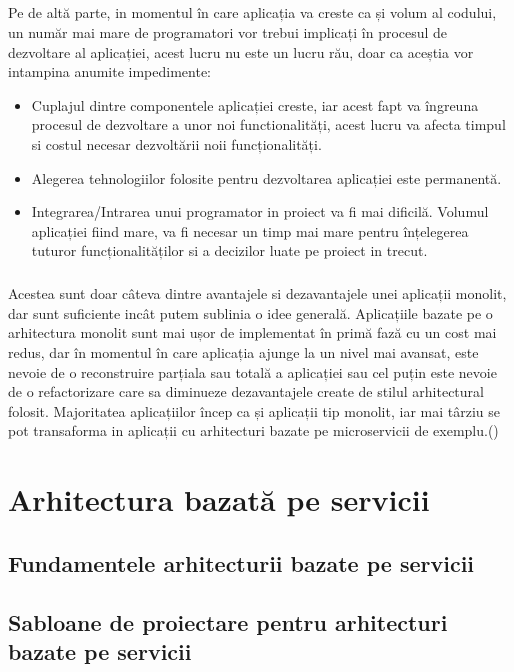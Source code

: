 \documentclass[12pt]{report}
\begin{document}
  	\paragraph{}Pe de altă parte, in momentul în care aplicația va creste ca și volum al codului, un număr mai mare de programatori vor trebui implicați în procesul de dezvoltare al aplicației, acest lucru nu este un lucru rău, doar ca aceștia vor intampina anumite impedimente:
  	\begin{itemize}
  	\item Cuplajul dintre componentele aplicației creste, iar acest fapt va îngreuna procesul de dezvoltare a unor noi functionalități, acest lucru va afecta timpul si costul necesar dezvoltării noii funcționalități.  
	\item Alegerea tehnologiilor folosite pentru dezvoltarea aplicației este permanentă.
	\item Integrarea/Intrarea unui programator in proiect va fi mai dificilă. Volumul aplicației fiind mare, va fi necesar un timp mai mare pentru înțelegerea tuturor funcționalităților si a decizilor luate pe proiect in trecut.
  	\end{itemize}
  	\paragraph{}Acestea sunt doar câteva dintre avantajele si dezavantajele unei aplicații monolit, dar sunt suficiente incât putem sublinia o idee generală. Aplicațiile bazate pe o arhitectura monolit sunt mai ușor de implementat în primă fază cu un cost mai redus, dar în momentul în care aplicația ajunge la un nivel mai avansat, este nevoie de o reconstruire parțiala sau totală a aplicației sau cel puțin este nevoie de o refactorizare care sa diminueze dezavantajele create de stilul arhitectural folosit. Majoritatea aplicațiilor încep ca și aplicații tip monolit, iar mai târziu se pot transaforma in aplicații cu arhitecturi bazate pe microservicii de exemplu.(\cite{thones2015microservices})
  \chapter{Arhitectura bazată pe servicii}
  	\section{Fundamentele arhitecturii bazate pe servicii}
  	\section{Sabloane de proiectare pentru arhitecturi bazate pe servicii}
  
\end{document}
